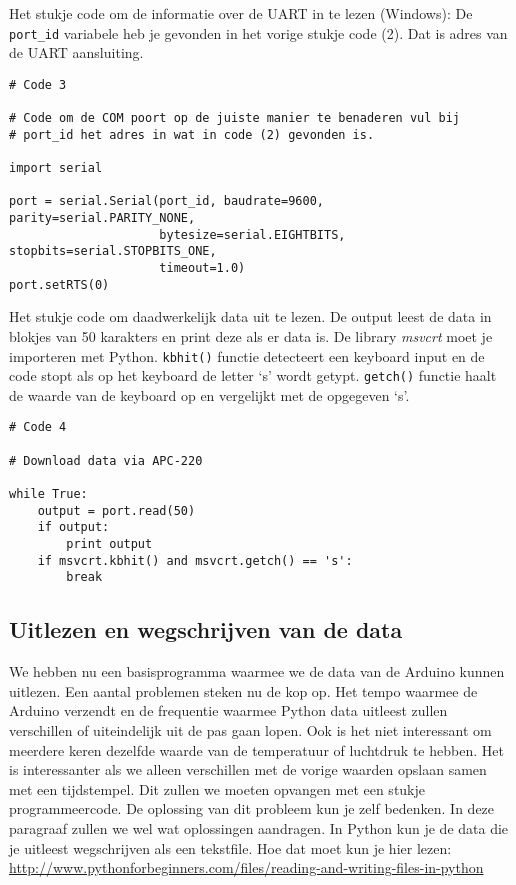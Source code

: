 Het stukje code om de informatie over de UART in te lezen (Windows):
De \verb|port_id| variabele heb je gevonden in het vorige stukje code (2).
Dat is adres van de UART aansluiting.

\begin{verbatim}
# Code 3

# Code om de COM poort op de juiste manier te benaderen vul bij 
# port_id het adres in wat in code (2) gevonden is.

import serial 

port = serial.Serial(port_id, baudrate=9600, parity=serial.PARITY_NONE, 
                     bytesize=serial.EIGHTBITS, stopbits=serial.STOPBITS_ONE,
                     timeout=1.0) 
port.setRTS(0)
\end{verbatim}

Het stukje code om daadwerkelijk data uit te lezen. De output leest de
data in blokjes van 50 karakters en print deze als er data is. De
library \emph{msvcrt} moet je importeren met Python. \verb|kbhit()|
functie detecteert een keyboard input en de code stopt als op het keyboard de
letter `s' wordt getypt. \verb|getch()| functie haalt de waarde van de keyboard 
 op en vergelijkt met de opgegeven `s'.

\begin{verbatim}
# Code 4

# Download data via APC-220  
 
while True:
    output = port.read(50)
    if output:
        print output
    if msvcrt.kbhit() and msvcrt.getch() == 's':
        break
\end{verbatim}


\subsection{Uitlezen en wegschrijven van de data}

We hebben nu een basisprogramma waarmee we de data van de Arduino kunnen
uitlezen. Een aantal problemen steken nu de kop op. Het tempo waarmee de
Arduino verzendt en de frequentie waarmee Python data uitleest zullen
verschillen of uiteindelijk uit de pas gaan lopen. Ook is het niet
interessant om meerdere keren dezelfde waarde van de temperatuur of
luchtdruk te hebben. Het is interessanter als we alleen verschillen met
de vorige waarden opslaan samen met een tijdstempel. Dit zullen we moeten opvangen met een stukje
programmeercode. De oplossing van dit probleem kun je zelf bedenken.
In deze paragraaf zullen we wel wat oplossingen aandragen.
In Python kun je de data die je uitleest wegschrijven als een tekstfile.
Hoe dat moet kun je hier lezen:
\url{http://www.pythonforbeginners.com/files/reading-and-writing-files-in-python}


